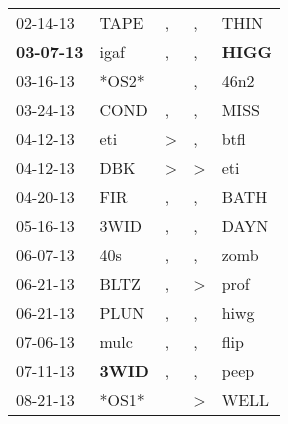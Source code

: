\begin{supertabular}{p{0.07\textwidth}p{0.06\textwidth}p{0.02\textwidth}p{0.02\textwidth}p{0.06\textwidth}}
          02-14-13\textsuperscript{} &           TAPE\textsuperscript{} &                , &                , &           THIN\textsuperscript{} \\
 \textbf{03-07-13\textsuperscript{}} &           igaf\textsuperscript{} &                , &                , &  \textbf{HIGG\textsuperscript{}} \\
          03-16-13\textsuperscript{} &                            *OS2* &                  &                , &           46n2\textsuperscript{} \\
          03-24-13\textsuperscript{} &           COND\textsuperscript{} &                , &                , &           MISS\textsuperscript{} \\
          04-12-13\textsuperscript{} &            eti\textsuperscript{} &     \textgreater &                , &           btfl\textsuperscript{} \\
          04-12-13\textsuperscript{} &            DBK\textsuperscript{} &     \textgreater &     \textgreater &            eti\textsuperscript{} \\
          04-20-13\textsuperscript{} &            FIR\textsuperscript{} &                , &                , &           BATH\textsuperscript{} \\
          05-16-13\textsuperscript{} &           3WID\textsuperscript{} &                , &                , &           DAYN\textsuperscript{} \\
          06-07-13\textsuperscript{} &            40s\textsuperscript{} &                , &                , &           zomb\textsuperscript{} \\
          06-21-13\textsuperscript{} &           BLTZ\textsuperscript{} &                , &     \textgreater &           prof\textsuperscript{} \\
          06-21-13\textsuperscript{} &           PLUN\textsuperscript{} &                , &                , &           hiwg\textsuperscript{} \\
          07-06-13\textsuperscript{} &           mulc\textsuperscript{} &                , &                , &           flip\textsuperscript{} \\
          07-11-13\textsuperscript{} &  \textbf{3WID\textsuperscript{}} &                , &                , &           peep\textsuperscript{} \\
          08-21-13\textsuperscript{} &                            *OS1* &                  &     \textgreater &           WELL\textsuperscript{} \\

\end{supertabular}
